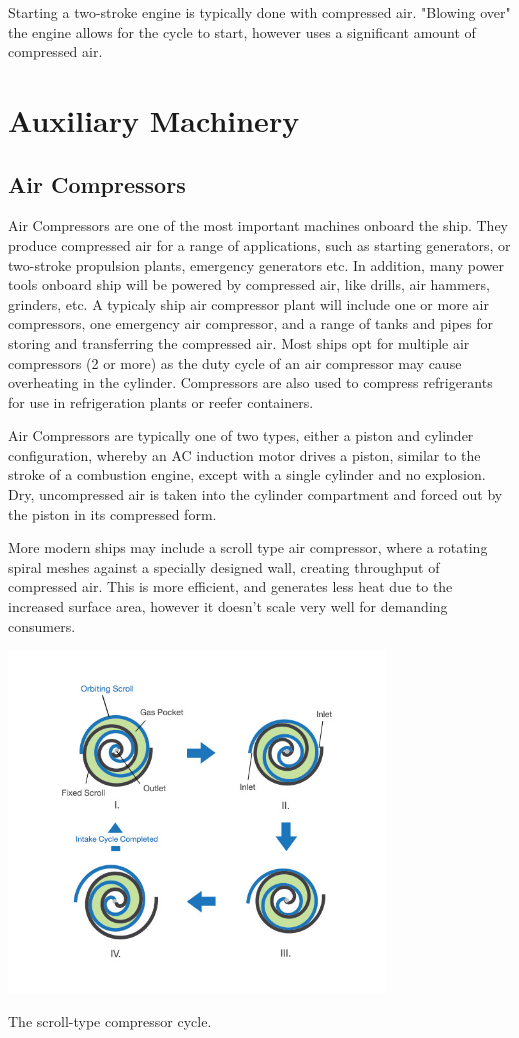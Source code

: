 \documentclass[11pt,a4paper]{article}
\begin{document}
Starting a two-stroke engine is typically done with compressed air. "Blowing over" the engine allows for the cycle to start, however uses a significant amount of compressed air.
\section{Auxiliary Machinery}

\subsection{Air Compressors}
Air Compressors are one of the most important machines onboard the ship. They produce compressed air for a range of applications, such as starting generators, or two-stroke propulsion plants, emergency generators etc. In addition, many power tools onboard ship will be powered by compressed air, like drills, air hammers, grinders, etc. A typicaly ship air compressor plant will include one or more air compressors, one emergency air compressor, and a range of tanks and pipes for storing and transferring the compressed air. Most ships opt for multiple air compressors (2 or more) as the duty cycle of an air compressor may cause overheating in the cylinder. Compressors are also used to compress refrigerants for use in refrigeration plants or reefer containers.

Air Compressors are typically one of two types, either a piston and cylinder configuration, whereby an AC induction motor drives a piston, similar to the stroke of a combustion engine, except with a single cylinder and no explosion. Dry, uncompressed air is taken into the cylinder compartment and forced out by the piston in its compressed form.

More modern ships may include a scroll type air compressor, where a rotating spiral meshes against a specially designed wall, creating throughput of compressed air. This is more efficient, and generates less heat due to the increased surface area, however it doesn't scale very well for demanding consumers.
\begin{center}
\includegraphics[width=10cm]{scroll.jpg}\par
The scroll-type compressor cycle.
\end{center}
\end{document}
